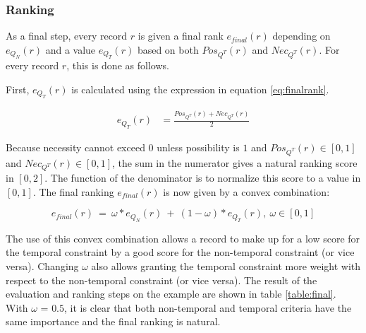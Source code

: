 
\subsubsection{Ranking}
As a final step, every record $r$ is given a final rank $e_{final}(r)$ depending on $e_{Q_{N}}(r)$ and a value $e_{Q_{T}}(r)$ based on both $Pos_{Q^{T}}(r)$ and $Nec_{Q^{T}}(r)$. For every record $r$, this is done as follows.

First, $e_{Q_{T}}(r)$ is calculated using the expression in equation \eqref{eq:finalrank}.

\vspace{-10pt}
\begin{align}
e_{Q_{T}}(r) & = \frac{Pos_{Q^{T}}(r) + Nec_{Q^{T}}(r)}{2} \label{eq:finalrank}
\end{align}


Because necessity cannot exceed $0$ unless possibility is $1$ and $Pos_{Q^{T}}(r) \in \left[0,1\right]$ and $Nec_{Q^{T}}(r) \in \left[0,1\right]$, the sum in the numerator gives a natural ranking score in $\left[0,2\right]$. The function of the denominator is to normalize this score to a value in $\left[0,1\right]$. The final ranking $e_{final}(r)$ is now given by a convex combination:

\vspace{-10pt}
\begin{equation}
\label{eq:convex-comb}
e_{final}(r)\ =\ \omega*e_{Q_{N}}(r)\ +\ (1-\omega)*e_{Q_{T}}(r),\ \omega \in \left[0, 1 \right]
\end{equation}

The use of this convex combination allows a record to make up for a low score for the temporal constraint by a good score for the non-temporal constraint (or vice versa). Changing $\omega$ also allows granting the temporal constraint more weight with respect to the non-temporal constraint (or vice versa). The result of the evaluation and ranking steps on the example are shown in table \ref{table:final}. With $\omega$ = $0.5$, it is clear that both non-temporal and temporal criteria have the same importance and the final ranking is natural.


